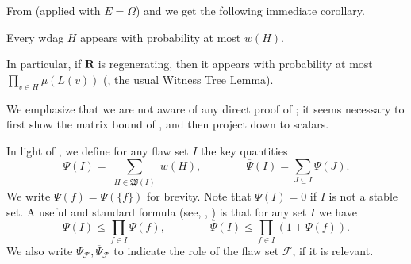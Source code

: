\documentclass{toc}
\begin{document}
{}From  %
%
%
%
%
(applied with $E = \Omega$) and  we get
the following immediate corollary. %
\begin{corollary}
\label{bndcord0}
%
Every  %
wdag $H$ appears with probability at most $ w(H)$. 

In particular, if $\mathbf R$ is regenerating, then it appears with probability at most $\prod_{v \in H} \mu(L(v))$ (\ie, the usual Witness Tree Lemma).
\end{corollary}

We emphasize that we are not aware of any direct proof of ; it seems necessary to first show the matrix bound of , and then project down to scalars.  
  
In light of , we define for any flaw set $I$ the key quantities
$$
\Psi(I) = \sum_{\substack{H \in \mathfrak W(I)}} w(H), \qquad \qquad \overline \Psi(I) = \sum_{J \subseteq I} \Psi(J).
$$
  We write $\Psi(f) = \Psi( \{f \})$ for brevity.  Note that $\Psi(I) = 0$ if $I$ is not a stable set. A useful and standard formula (see, \eg, \cite[Claim 59]{HV}) is that for any set $I$ we have $$
  \Psi(I) \leq \prod_{f \in I} \Psi(f), \qquad \qquad \overline \Psi(I) \leq \prod_{f \in I} (1 + \Psi(f)).
  $$
 We also write $\Psi_{\mathcal F}, \overline \Psi_{\mathcal F}$ to indicate the role of the flaw set $\mathcal F$, if it is relevant.  
  
\end{document}

